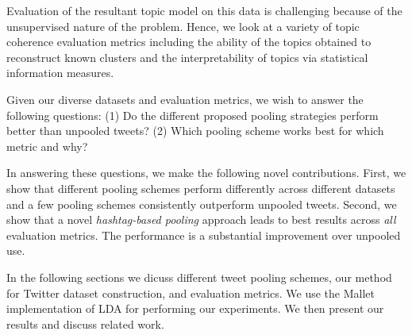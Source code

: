 \documentclass{sig-alternate}
\begin{document}
Evaluation of the resultant topic model on this data is challenging
because of the unsupervised nature of the problem.  Hence, we look at
a variety of topic coherence evaluation metrics including the ability
of the topics obtained to reconstruct known clusters and
the interpretability of topics via statistical information measures.

%

Given our diverse datasets and evaluation metrics, we wish to answer
the following questions:
(1) Do the different proposed pooling strategies perform better than
  unpooled tweets?
(2) Which pooling scheme works best for which metric and why?

In answering these questions, we make the following novel
contributions.
First, we show that different pooling schemes perform differently
  across different datasets and a few pooling schemes consistently
  outperform unpooled tweets.
Second, we show that a novel \emph{hashtag-based pooling} approach leads
  to best results across \emph{all} evaluation metrics.  The
  performance is a substantial improvement over unpooled use.

In the following sections 
we dicuss different tweet pooling
schemes, our method for Twitter dataset
construction, and evaluation
metrics. 
We use the Mallet \cite{mallet} implementation of LDA for
performing our experiments.
We then present our results and discuss related work.
\end{document}
